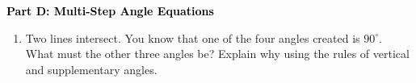 \documentclass[12pt, letterpaper, fleqn]{article}
\begin{document}
\newpage

\begin{tcolorbox}[colback=customteal!20]
\large\textcolor{black}{\textbf{Part D: Multi-Step Angle Equations}}
\end{tcolorbox}

\vspace{3mm}

\begin{enumerate}[itemsep=4.2cm, leftmargin=0.6cm, resume]
\item Two lines intersect. You know that one of the four angles created is $90^\circ$. What must the other three angles be? Explain why using the rules of vertical and supplementary angles.
\end{enumerate}
\end{document}
